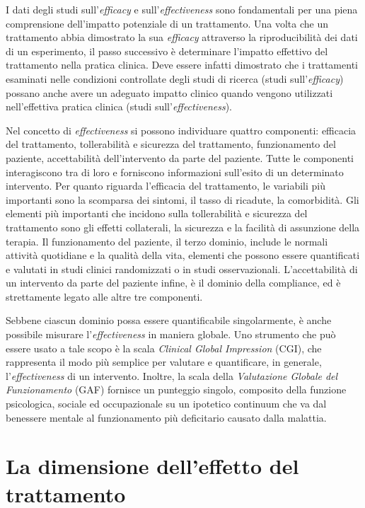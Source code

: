 \documentclass[
  11pt,
]{krantz}
\theoremstyle{definition}
\theoremstyle{definition}
\theoremstyle{definition}
\theoremstyle{definition}
\theoremstyle{remark}
\begin{document}
I dati degli studi sull'\emph{efficacy} e sull'\emph{effectiveness} sono fondamentali per una piena comprensione dell'impatto potenziale di un trattamento. Una volta che un trattamento abbia dimostrato la sua \emph{efficacy} attraverso la riproducibilità dei dati di un esperimento, il passo successivo è determinare l'impatto effettivo del trattamento nella pratica clinica. Deve essere infatti dimostrato che i trattamenti esaminati nelle condizioni controllate degli studi di ricerca (studi sull'\emph{efficacy}) possano anche avere un adeguato impatto clinico quando vengono utilizzati nell'effettiva pratica clinica (studi sull'\emph{effectiveness}).

Nel concetto di \emph{effectiveness} si possono individuare quattro componenti: efficacia del trattamento, tollerabilità e sicurezza del trattamento, funzionamento del paziente, accettabilità dell'intervento da parte del paziente. Tutte le componenti interagiscono tra di loro e forniscono informazioni sull'esito di un determinato intervento. Per quanto riguarda l'efficacia del trattamento, le variabili più importanti sono la scomparsa dei sintomi, il tasso di ricadute, la comorbidità. Gli elementi più importanti che incidono sulla tollerabilità e sicurezza del trattamento sono gli effetti collaterali, la sicurezza e la facilità di assunzione della terapia. Il funzionamento del paziente, il terzo dominio, include le normali attività quotidiane e la qualità della vita, elementi che possono essere quantificati e valutati in studi clinici randomizzati o in studi osservazionali. L'accettabilità di un intervento da parte del paziente infine, è il dominio della compliance, ed è strettamente legato alle altre tre componenti.

Sebbene ciascun dominio possa essere quantificabile singolarmente, è anche possibile misurare l'\emph{effectiveness} in maniera globale. Uno strumento che può essere usato a tale scopo è la scala \emph{Clinical Global Impression} (CGI), che rappresenta il modo più semplice per valutare e quantificare, in generale, l'\emph{effectiveness} di un intervento. Inoltre, la scala della \emph{Valutazione Globale del Funzionamento} (GAF) fornisce un punteggio singolo, composito della funzione psicologica, sociale ed occupazionale su un ipotetico continuum che va dal benessere mentale al funzionamento più deficitario causato dalla malattia.

\hypertarget{ch:effect_size}{%
\chapter{La dimensione dell'effetto del trattamento}\label{ch:effect_size}}
\end{document}
